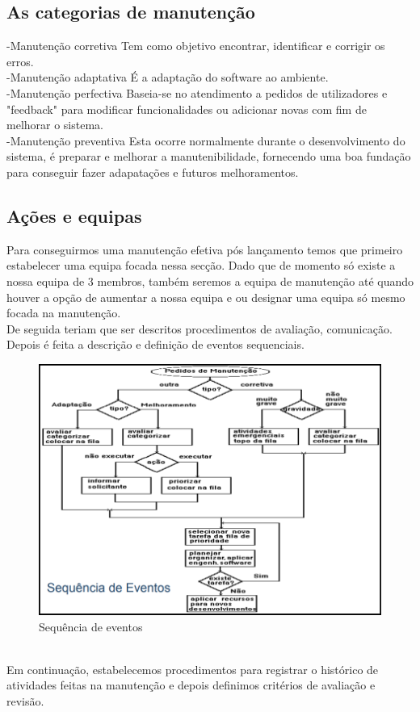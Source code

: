 \subsection{As categorias de manutenção}
-Manutenção corretiva 
Tem como objetivo encontrar, identificar e corrigir os erros.\\
-Manutenção adaptativa
É a adaptação do software ao ambiente.\\
-Manutenção perfectiva
Baseia-se no atendimento a pedidos de utilizadores e "feedback" para modificar funcionalidades ou adicionar novas com fim de melhorar o sistema.\\
-Manutenção preventiva
Esta ocorre normalmente durante o desenvolvimento do sistema, é preparar e melhorar a manutenibilidade, fornecendo uma boa fundação para conseguir fazer adapatações e futuros melhoramentos.

\subsection{Ações e equipas}
Para conseguirmos uma manutenção efetiva pós lançamento temos que primeiro estabelecer uma equipa focada nessa secção. Dado que de momento só existe a nossa equipa de 3 membros, também seremos a equipa de manutenção até quando houver a opção de aumentar a nossa equipa e ou designar uma equipa só mesmo focada na manutenção.\\
De seguida teriam que ser descritos procedimentos de avaliação, comunicação.\\
Depois é feita a descrição e definição de eventos sequenciais.\\

\begin{figure}[H]
	\centering
	\includegraphics[width=15cm]{Manutenção2}
	\caption{Sequência de eventos}
	\label{fig:Manutenção2}
\end{figure}
\\
Em continuação, estabelecemos procedimentos para registrar o histórico de atividades feitas na manutenção e depois definimos critérios de avaliação e revisão.